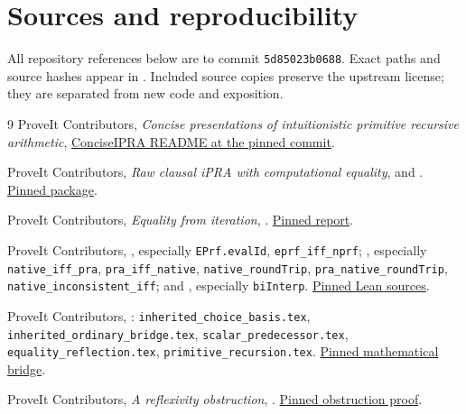 \documentclass[11pt]{article}
\theoremstyle{definition}\newtheorem{definition}[theorem]{Definition}
\newcommand{\repo}{\texttt{5d85023b0688}}
\begin{document}
\section{Sources and reproducibility}\label{sec:sources}

All repository references below are to commit \repo. Exact paths
and source hashes appear in .
Included source copies preserve the upstream license; they are
separated from new code and exposition.

\clearpage
\begingroup\raggedright
\begin{thebibliography}{9}
ProveIt Contributors, \emph{Concise presentations of intuitionistic
primitive recursive arithmetic},
\href{https://github.com/VladimirReshetnikov/ProveIt/blob/5d85023b0688e03b75f0ec3a04bb43ef0bb51705/Logic/PrimitiveRecursiveArithmetic/ConciseIPRA/README.md}{ConciseIPRA README at the pinned commit}.

ProveIt Contributors, \emph{Raw clausal iPRA with computational equality},
 and
.
\href{https://github.com/VladimirReshetnikov/ProveIt/tree/5d85023b0688e03b75f0ec3a04bb43ef0bb51705/Logic/PrimitiveRecursiveArithmetic/ConciseIPRA/Research/raw_clausal}{Pinned package}.

ProveIt Contributors, \emph{Equality from iteration},
.
\href{https://github.com/VladimirReshetnikov/ProveIt/blob/5d85023b0688e03b75f0ec3a04bb43ef0bb51705/Logic/PrimitiveRecursiveArithmetic/ConciseIPRA/Research/equality_from_iteration/report.tex}{Pinned report}.

ProveIt Contributors, ,
especially \texttt{EPrf.evalId}, \texttt{eprf\_iff\_nprf};
, especially
\texttt{native\_iff\_pra}, \texttt{pra\_iff\_native},
\texttt{native\_roundTrip}, \texttt{pra\_native\_roundTrip},
\texttt{native\_inconsistent\_iff}; and
, especially \texttt{biInterp}.
\href{https://github.com/VladimirReshetnikov/ProveIt/tree/5d85023b0688e03b75f0ec3a04bb43ef0bb51705/Logic/PrimitiveRecursiveArithmetic/ConciseIPRA/Lean/ConciseIPRA}{Pinned Lean sources}.

ProveIt Contributors, :
\texttt{inherited\_choice\_basis.tex},
\texttt{inherited\_ordinary\_bridge.tex},
\texttt{scalar\_predecessor.tex},
\texttt{equality\_reflection.tex},
\texttt{primitive\_recursion.tex}.
\href{https://github.com/VladimirReshetnikov/ProveIt/tree/5d85023b0688e03b75f0ec3a04bb43ef0bb51705/Logic/PrimitiveRecursiveArithmetic/ConciseIPRA/Research/certified_zero/reference}{Pinned mathematical bridge}.

ProveIt Contributors, \emph{A reflexivity obstruction},
.
\href{https://github.com/VladimirReshetnikov/ProveIt/blob/5d85023b0688e03b75f0ec3a04bb43ef0bb51705/Logic/PrimitiveRecursiveArithmetic/ConciseIPRA/Research/raw_clausal/theory/reflexivity_obstruction.tex}{Pinned obstruction proof}.
\end{thebibliography}
\endgroup
\end{document}
